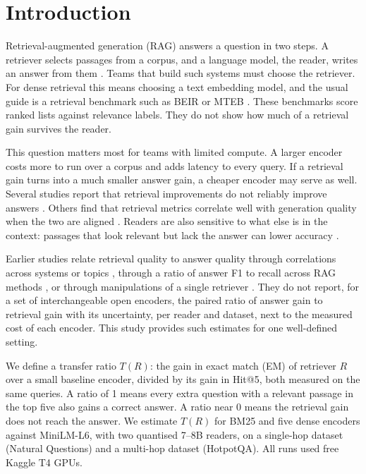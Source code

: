 \section{Introduction}\label{sec:intro}

Retrieval-augmented generation (RAG) answers a question in two steps. A retriever selects passages from a corpus, and a language model, the reader, writes an answer from them \citep{lewis2020rag,izacard2021fid,ram2023incontext}. Teams that build such systems must choose the retriever. For dense retrieval this means choosing a text embedding model, and the usual guide is a retrieval benchmark such as BEIR \citep{thakur2021beir} or MTEB \citep{muennighoff2023mteb}. These benchmarks score ranked lists against relevance labels. They do not show how much of a retrieval gain survives the reader.

This question matters most for teams with limited compute. A larger encoder costs more to run over a corpus and adds latency to every query. If a retrieval gain turns into a much smaller answer gain, a cheaper encoder may serve as well. Several studies report that retrieval improvements do not reliably improve answers \citep{salemi2024erag,mathur2026policy,medrano2026fusion,ghosh2026evidence}. Others find that retrieval metrics correlate well with generation quality when the two are aligned \citep{samuel2026beyond}. Readers are also sensitive to what else is in the context: passages that look relevant but lack the answer can lower accuracy \citep{cuconasu2024power,amiraz2025distracting,shi2023distracted}.

Earlier studies relate retrieval quality to answer quality through correlations across systems or topics \citep{salemi2024erag,samuel2026beyond,trappolini2025udcg}, through a ratio of answer F1 to recall across RAG methods \citep{peng2026neocorrag}, or through manipulations of a single retriever \citep{leto2024toward}. They do not report, for a set of interchangeable open encoders, the paired ratio of answer gain to retrieval gain with its uncertainty, per reader and dataset, next to the measured cost of each encoder. This study provides such estimates for one well-defined setting.

We define a transfer ratio $T(R)$: the gain in exact match (EM) of retriever $R$ over a small baseline encoder, divided by its gain in Hit@5, both measured on the same queries. A ratio of 1 means every extra question with a relevant passage in the top five also gains a correct answer. A ratio near 0 means the retrieval gain does not reach the answer. We estimate $T(R)$ for BM25 and five dense encoders against MiniLM-L6, with two quantised 7--8B readers, on a single-hop dataset (Natural Questions) and a multi-hop dataset (HotpotQA). All runs used free Kaggle T4 GPUs.

